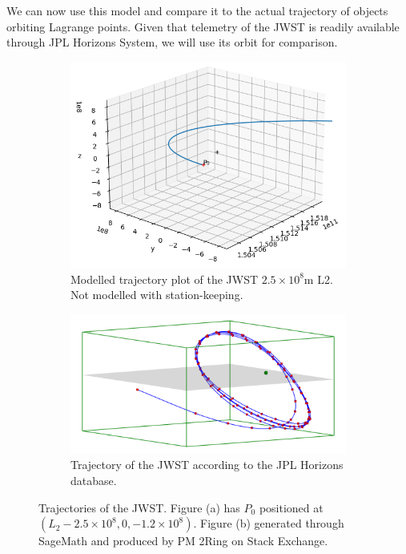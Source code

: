 We can now use this model and compare it to the actual trajectory of objects orbiting Lagrange points.
Given that telemetry of the JWST is readily available through JPL Horizons System, we will use its orbit for comparison.
\begin{figure}[H]
	\centering
	\captionsetup[subfigure]{justification=centering}
	\begin{subfigure}[b]{0.4\textwidth}
		\centering
		\includegraphics[scale=0.5]{3dplot3.png}
		\caption{Modelled trajectory plot of the JWST $2.5\times10^8\si{\metre}$ L2. Not modelled with station-keeping.}
		\label{fig:3dplot3}
	\end{subfigure}
	\quad
	\begin{subfigure}[b]{0.4\textwidth}
		\centering
		\includegraphics[scale=0.2]{xyjwstplot.png}
		\vspace*{1em}
		\caption{Trajectory of the JWST according to the JPL Horizons database.}
		\label{fig:3dplot4}
		\vspace*{1em}
	\end{subfigure}
	\caption{Trajectories of the JWST. Figure (a) has $P_0$ positioned at $(L_2 - 2.5\times10^8, 0, - 1.2\times10^8)$. Figure (b) generated through SageMath and produced by PM 2Ring on Stack Exchange.}
\end{figure}
